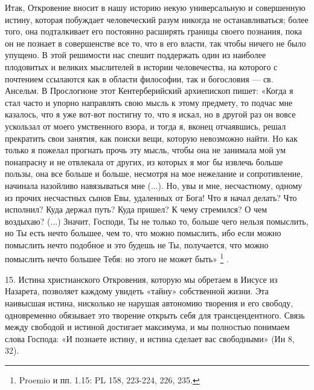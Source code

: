 \documentclass[a5paper,10pt]{article}
\begin{document}
Итак, Откровение вносит в нашу историю некую универсальную и совершенную
истину, которая побуждает человеческий разум никогда не останавливаться; более
того, она подталкивает его постоянно расширять границы своего познания, пока он
не познает в совершенстве все то, что в его власти, так чтобы ничего не было
упущено. В этой решимости нас спешит поддержать один из наиболее плодовитых и
великих мыслителей в истории человечества, на которого с почтением ссылаются
как в области философии, так и богословия — св. Ансельм. В Прослогионе этот
Кентерберийский архиепископ пишет: «Когда я стал часто и упорно направлять свою
мысль к этому предмету, то подчас мне казалось, что я уже вот-вот постигну то,
что я искал, но в другой раз он вовсе ускользал от моего умственного взора, и
тогда я, вконец отчаявшись, решал прекратить свои занятия, как поиски вещи,
которую невозможно найти. Но как только я пожелал прогнать прочь эту мысль,
чтобы она не занимала мой ум понапрасну и не отвлекала от других, из которых я
мог бы извлечь больше пользы, она все больше и больше, несмотря на мое
нежелание и сопротивление, начинала назойливо навязываться мне (...). Но, увы и
мне, несчастному, одному из прочих несчастных сынов Евы, удаленных от Бога! Что
я начал делать? Что исполнил? Куда держал путь? Куда пришел? К чему стремился?
О чем воздыхаю? (...) Значит, Господи, Ты не только то, больше чего нельзя
помыслить, но Ты есть нечто большее, чем то, что можно помыслить, ибо если
можно помыслить нечто подобное и это будешь не Ты, получается, что можно
помыслить нечто большее Тебя: но этого не может быть» \footnote{Proemio и пп.
1.15: PL 158, 223-224, 226, 235.} .

15. Истина христианского Откровения, которую мы обретаем в Иисусе из Назарета,
позволяет каждому увидеть «тайну» собственной жизни. Эта наивысшая истина,
нисколько не нарушая автономию творения и его свободу, одновременно обязывает
это творение открыть себя для трансцендентного. Связь между свободой и истиной
достигает максимума, и мы полностью понимаем слова Господа: «И познаете истину,
и истина сделает вас свободными» (Ин 8, 32).
\end{document}
